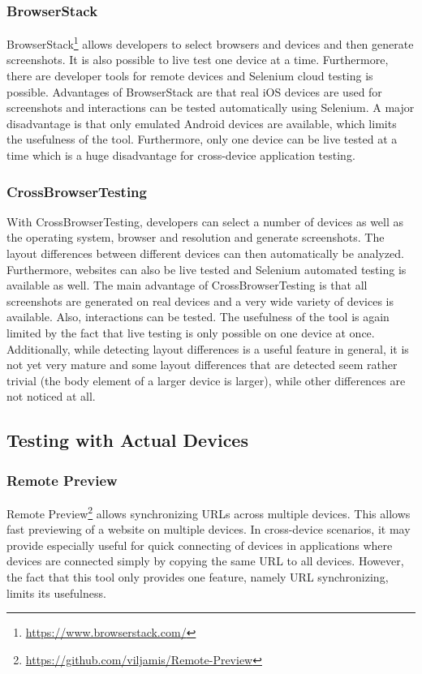 \subsubsection{BrowserStack}

BrowserStack\footnote{\url{https://www.browserstack.com/}} allows developers to select browsers and devices and then generate screenshots. It is also possible to live test one device at a time. Furthermore, there are developer tools for remote devices and Selenium cloud testing is possible. Advantages of BrowserStack are that real iOS devices are used for screenshots and interactions can be tested automatically using Selenium. A major disadvantage is that only emulated Android devices are available, which limits the usefulness of the tool. Furthermore, only one device can be live tested at a time which is a huge disadvantage for cross-device application testing. 

\subsubsection{CrossBrowserTesting}

With CrossBrowserTesting, developers can select a number of devices as well as the operating system, browser and resolution and generate screenshots. The layout differences between different devices can then automatically be analyzed. Furthermore, websites can also be live tested and Selenium automated testing is available as well. The main advantage of CrossBrowserTesting is that all screenshots are generated on real devices and a very wide variety of devices is available. Also, interactions can be tested. The usefulness of the tool is again limited by the fact that live testing is only possible on one device at once. Additionally, while detecting layout differences is a useful feature in general, it is not yet very mature and some layout differences that are detected seem rather trivial (the body element of a larger device is larger), while other differences are not noticed at all.

\subsection{Testing with Actual Devices}

\subsubsection{Remote Preview}

Remote Preview\footnote{\url{https://github.com/viljamis/Remote-Preview}} allows synchronizing URLs across multiple devices. This allows fast previewing of a website on multiple devices. In cross-device scenarios, it may provide especially useful for quick connecting of devices in applications where devices are connected simply by copying the same URL to all devices. However, the fact that this tool only provides one feature, namely URL synchronizing, limits its usefulness.

